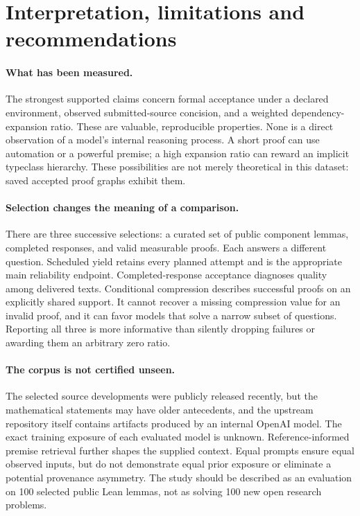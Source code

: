 \documentclass[11pt]{article}
\begin{document}
\FloatBarrier
\section{Interpretation, limitations and recommendations}
\label{sec:discussion}
\paragraph{What has been measured.}
The strongest supported claims concern formal acceptance under a declared environment, observed submitted-source concision, and a weighted dependency-expansion ratio. These are valuable, reproducible properties. None is a direct observation of a model's internal reasoning process. A short proof can use automation or a powerful premise; a high expansion ratio can reward an implicit typeclass hierarchy. These possibilities are not merely theoretical in this dataset: saved accepted proof graphs exhibit them.

\paragraph{Selection changes the meaning of a comparison.}
There are three successive selections: a curated set of public component lemmas, completed responses, and valid measurable proofs. Each answers a different question. Scheduled yield retains every planned attempt and is the appropriate main reliability endpoint. Completed-response acceptance diagnoses quality among delivered texts. Conditional compression describes successful proofs on an explicitly shared support. It cannot recover a missing compression value for an invalid proof, and it can favor models that solve a narrow subset of questions. Reporting all three is more informative than silently dropping failures or awarding them an arbitrary zero ratio.

\paragraph{The corpus is not certified unseen.}
The selected source developments were publicly released recently, but the mathematical statements may have older antecedents, and the upstream repository itself contains artifacts produced by an internal OpenAI model. The exact training exposure of each evaluated model is unknown. Reference-informed premise retrieval further shapes the supplied context. Equal prompts ensure equal observed inputs, but do not demonstrate equal prior exposure or eliminate a potential provenance asymmetry. The study should be described as an evaluation on 100 selected public Lean lemmas, not as solving 100 new open research problems.
\end{document}
